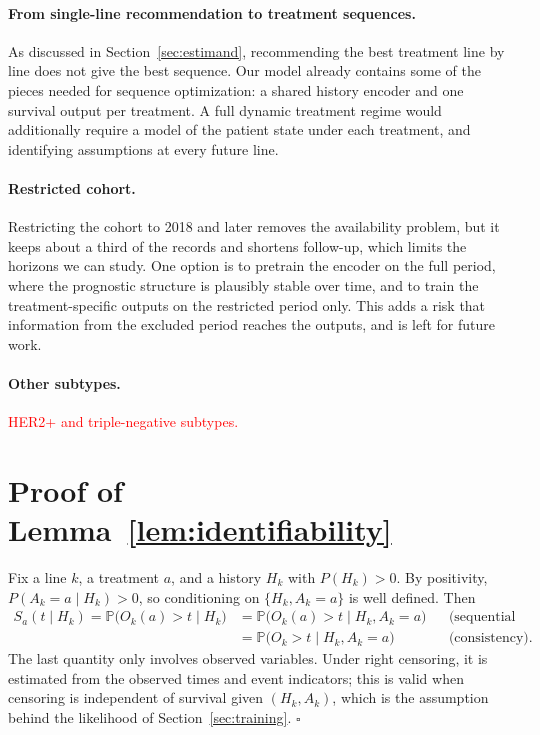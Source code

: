 \documentclass[a4paper,10pt]{article}
\newcommand{\todo}[1]{\textcolor{red}{#1}}
\begin{document}
\paragraph{From single-line recommendation to treatment sequences.} As discussed in Section~\ref{sec:estimand}, recommending the best treatment line by line does not give the best sequence. Our model already contains some of the pieces needed for sequence optimization: a shared history encoder and one survival output per treatment. A full dynamic treatment regime would additionally require a model of the patient state under each treatment, and identifying assumptions at every future line.

\paragraph{Restricted cohort.} Restricting the cohort to 2018 and later removes the availability problem, but it keeps about a third of the records and shortens follow-up, which limits the horizons we can study. One option is to pretrain the encoder on the full period, where the prognostic structure is plausibly stable over time, and to train the treatment-specific outputs on the restricted period only. This adds a risk that information from the excluded period reaches the outputs, and is left for future work.

\paragraph{Other subtypes.} \todo{HER2+ and triple-negative subtypes.}

\appendix

\section{Proof of Lemma~\ref{lem:identifiability}}
\label{app:identifiability}

Fix a line $k$, a treatment $a$, and a history $H_k$ with $P(H_k) > 0$. By positivity, $P(A_k = a \mid H_k) > 0$, so conditioning on $\{H_k, A_k = a\}$ is well defined. Then
\begin{align}
    S_a(t \mid H_k) = \mathbb{P}\big(O_k(a) > t \mid H_k\big)
    &= \mathbb{P}\big(O_k(a) > t \mid H_k, A_k = a\big) && \text{(sequential ignorability)} \\
    &= \mathbb{P}\big(O_k > t \mid H_k, A_k = a\big) && \text{(consistency).}
\end{align}
The last quantity only involves observed variables. Under right censoring, it is estimated from the observed times and event indicators; this is valid when censoring is independent of survival given $(H_k, A_k)$, which is the assumption behind the likelihood of Section~\ref{sec:training}. $\square$
\end{document}
